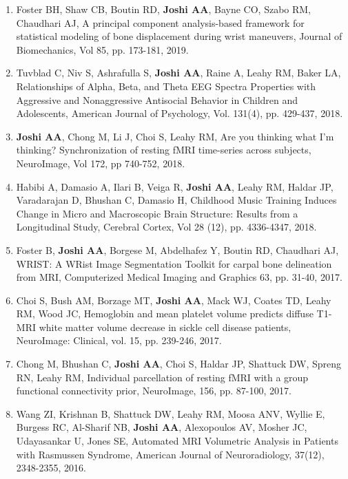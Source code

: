 \documentclass[overlapped,line,letterpaper]{res}
\begin{document}
\begin{resume}
\begin{enumerate}
    \item Foster BH, Shaw CB, Boutin RD, \textbf{Joshi AA}, Bayne CO, Szabo RM, Chaudhari AJ, {A principal component analysis-based framework for statistical modeling of bone displacement during wrist maneuvers}, {Journal of Biomechanics}, Vol 85, pp. 173-181, 2019.

    \item Tuvblad C, Niv S, Ashrafulla S, \textbf{Joshi AA}, Raine A, Leahy RM, Baker LA, {Relationships of Alpha, Beta, and Theta EEG Spectra Properties with Aggressive and Nonaggressive Antisocial Behavior in Children and Adolescents}, {American Journal of Psychology}, Vol. 131(4), pp. 429-437, 2018.

    \item \textbf{Joshi AA}, Chong M, Li J, Choi S, Leahy RM, {Are you thinking what I'm thinking? Synchronization of resting fMRI time-series across subjects}, {NeuroImage}, Vol 172, pp 740-752, 2018.

    \item Habibi A, Damasio A, Ilari B, Veiga R, \textbf{Joshi AA}, Leahy RM, Haldar JP, Varadarajan D, Bhushan C, Damasio H, Childhood Music Training Induces Change in Micro and Macroscopic Brain Structure: Results from a Longitudinal Study, Cerebral Cortex,  Vol 28 (12), pp. 4336-4347, 2018.

    \item Foster B, \textbf{Joshi AA}, Borgese M, Abdelhafez Y, Boutin RD, Chaudhari AJ, {WRIST: A WRist Image Segmentation Toolkit for carpal bone delineation from MRI}, Computerized Medical Imaging and Graphics 63, pp. 31-40, 2017.

    \item Choi S, Bush AM, Borzage MT, \textbf{Joshi AA}, Mack WJ, Coates TD, Leahy RM, Wood JC, {Hemoglobin and mean platelet volume predicts diffuse T1-MRI white matter volume decrease in sickle cell disease patients}, NeuroImage: Clinical, vol. 15, pp. 239-246, 2017. 

    \item Chong M, Bhushan C, \textbf{Joshi AA}, Choi S, Haldar JP, Shattuck DW, Spreng RN, Leahy RM, Individual parcellation of resting fMRI with a group functional connectivity prior, NeuroImage, 156, pp. 87-100, 2017. 

    \item Wang ZI, Krishnan B, Shattuck DW, Leahy RM, Moosa ANV, Wyllie E, Burgess RC, Al-Sharif NB, \textbf{Joshi AA}, Alexopoulos AV, Mosher JC, Udayasankar U, Jones SE, {Automated MRI Volumetric Analysis in Patients with Rasmussen Syndrome}, American Journal of Neuroradiology, 37(12), 2348-2355, 2016.


\end{enumerate}
\end{resume}
\end{document}
